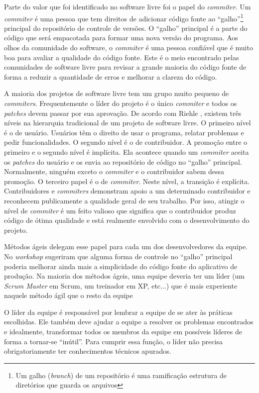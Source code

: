Parte do valor que foi identificado no software livre foi o papel do
\emph{commiter}. Um \emph{commiter} é uma pessoa que tem direitos de
adicionar código fonte ao ``galho''\footnote{Um galho (\emph{branch})
  de um repositório é uma ramificação estrutura de diretórios que
  guarda os arquivos} principal do repositório de controle de
versões. O ``galho'' principal é a parte do código que será empacotada
para formar uma nova versão do programa. Aos olhos da comunidade do
software, o \emph{commiter} é uma pessoa confiável que é muito boa
para avaliar a qualidade do código fonte. Este é o meio encontrado
pelas comunidades de software livre para revisar a grande maioria do
código fonte de forma a reduzir a quantidade de erros e melhorar a
clareza do código.

A maioria dos projetos de software livre tem um grupo muito pequeno de
\emph{commiters}. Frequentemente o líder do projeto é o único
\emph{commiter} e todos os \emph{patches} devem passar por sua
aprovação. De acordo com Riehle \cite{Riehle2007}, existem três níveis
na hierarquia tradicional de um projeto de software livre. O primeiro
nível é o de usuário. Usuários têm o direito de usar o programa,
relatar problemas e pedir funcionalidades. O segundo nível é o de
contribuidor. A promoção entre o primeiro e o segundo nível é
implícita. Ela acontece quando um \emph{commiter} aceita os
\emph{patches} do usuário e os envia ao repositório de código no
``galho'' principal. Normalmente, ninguém exceto o \emph{commiter} e o
contribuidor sabem dessa promoção. O terceiro papel é o de
\emph{commiter}. Neste nível, a transição é explícita. Contribuidores
e \emph{commiters} demonstram apoio a um determinado contribuidor e
reconhecem publicamente a qualidade geral de seu trabalho. Por isso,
atingir o nível de \emph{commiter} é um feito valioso que significa
que o contribuidor produz código de ótima qualidade e está realmente
envolvido com o desenvolvimento do projeto.

Métodos ágeis delegam esse papel para cada um dos desenvolvedores da
equipe. No \emph{workshop} sugeriram que alguma forma de controle no
``galho'' principal poderia melhorar ainda mais a simplicidade do
código fonte do aplicativo de produção. Na maioria dos métodos ágeis,
uma equipe deveria ter um líder (um \emph{Scrum Master} em Scrum, um
treinador em XP, etc...) que é mais experiente naquele método ágil que
o resto da equipe

O líder da equipe é responsável por lembrar a equipe de se ater às
práticas escolhidas. Ele também deve ajudar a equipe a resolver os
problemas encontrados e idealmente, transformar todos os membros da
equipe em possíveis líderes de forma a tornar-se ``inútil''. Para
cumprir essa função, o líder não precisa obrigatoriamente ter
conhecimentos técnicos apurados.

